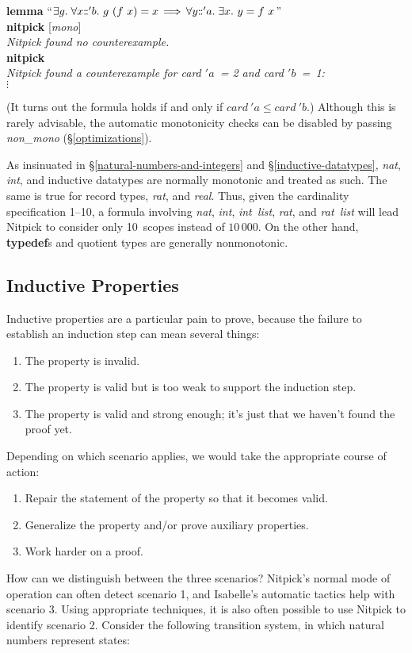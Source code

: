 \documentclass[a4paper,12pt]{article}
\def\Colon{\mathord{:\mkern-1.5mu:}}
\begin{document}
\prew
\textbf{lemma} ``$\exists g.\; \forall x\Colon 'b.~g~(f~x) = x
 \,\Longrightarrow\, \forall y\Colon {'}a.\; \exists x.~y = f~x$'' \\
\textbf{nitpick} [\textit{mono}] \\[2\smallskipamount]
{\slshape Nitpick found no counterexample.} \\[2\smallskipamount]
\textbf{nitpick} \\[2\smallskipamount]
\slshape
Nitpick found a counterexample for \textit{card} $'a$~= 2 and \textit{card} $'b$~=~1: \\
\hbox{}\qquad $\vdots$
\postw

(It turns out the formula holds if and only if $\textit{card}~'a \le
\textit{card}~'b$.) Although this is rarely advisable, the automatic
monotonicity checks can be disabled by passing \textit{non\_mono}
(\S\ref{optimizations}).

As insinuated in \S\ref{natural-numbers-and-integers} and
\S\ref{inductive-datatypes}, \textit{nat}, \textit{int}, and inductive datatypes
are normally monotonic and treated as such. The same is true for record types,
\textit{rat}, and \textit{real}. Thus, given the
cardinality specification 1--10, a formula involving \textit{nat}, \textit{int},
\textit{int~list}, \textit{rat}, and \textit{rat~list} will lead Nitpick to
consider only 10~scopes instead of $10\,000$. On the other hand,
\textbf{typedef}s and quotient types are generally nonmonotonic.

\subsection{Inductive Properties}
\label{inductive-properties}

Inductive properties are a particular pain to prove, because the failure to
establish an induction step can mean several things:
%
\begin{enumerate}
\item The property is invalid.
\item The property is valid but is too weak to support the induction step.
\item The property is valid and strong enough; it's just that we haven't found
the proof yet.
\end{enumerate}
%
Depending on which scenario applies, we would take the appropriate course of
action:
%
\begin{enumerate}
\item Repair the statement of the property so that it becomes valid.
\item Generalize the property and/or prove auxiliary properties.
\item Work harder on a proof.
\end{enumerate}
%
How can we distinguish between the three scenarios? Nitpick's normal mode of
operation can often detect scenario 1, and Isabelle's automatic tactics help with
scenario 3. Using appropriate techniques, it is also often possible to use
Nitpick to identify scenario 2. Consider the following transition system,
in which natural numbers represent states:
\end{document}
